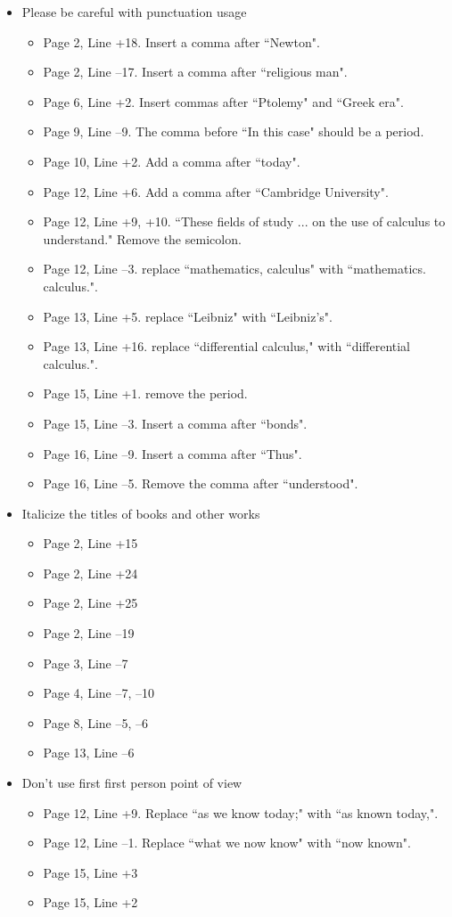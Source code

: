 \documentclass[11pt]{article}
\begin{document}
\begin{itemize}
	\item Please be careful with punctuation usage
	\begin{itemize}
		\item Page 2, Line +18. Insert a comma after ``Newton".
		\item Page 2, Line --17. Insert a comma after ``religious man".
		\item Page 6, Line +2. Insert commas after ``Ptolemy" and ``Greek era".
		\item Page 9, Line --9. The comma before ``In this case" should be a period.
		\item Page 10, Line +2. Add a comma after ``today".
		\item Page 12, Line +6. Add a comma after ``Cambridge University".
		\item Page 12, Line +9, +10. ``These fields of study ... on the use of calculus to understand." Remove the semicolon. 
		\item Page 12, Line --3. replace ``mathematics, calculus" with ``mathematics. calculus.".
		\item Page 13, Line +5. replace ``Leibniz" with ``Leibniz's".
		\item Page 13, Line +16. replace ``differential calculus," with ``differential calculus.".
		\item Page 15, Line +1. remove the period.
		\item Page 15, Line --3. Insert a comma after ``bonds".
		\item Page 16, Line --9. Insert a comma after ``Thus".
		\item Page 16, Line --5. Remove the comma after ``understood".
	\end{itemize}
	
	\item Italicize the titles of books and other works
	\begin{itemize}
		\item Page 2, Line +15
		\item Page 2, Line +24
		\item Page 2, Line +25
		\item Page 2, Line --19
		\item Page 3, Line --7
		\item Page 4, Line --7, --10
		\item Page 8, Line --5, --6
		\item Page 13, Line --6		
	\end{itemize}
	
	\item Don't use first first person point of view
	\begin{itemize}
		\item Page 12, Line +9. Replace ``as we know today;" with ``as known today,".
		\item Page 12, Line --1. Replace ``what we now know" with ``now known".
		\item Page 15, Line +3
		\item Page 15, Line +2
	\end{itemize}
	

\end{itemize}
\end{document}
